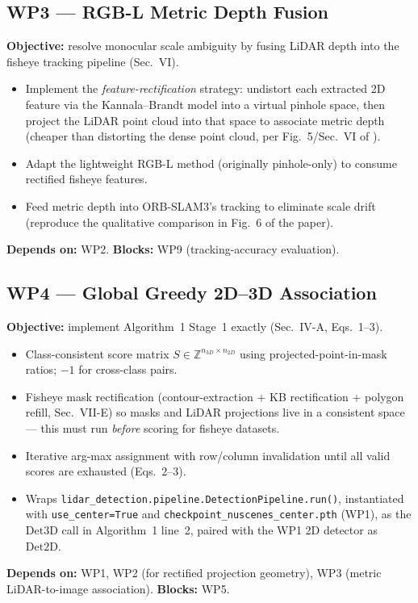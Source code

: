 \documentclass[11pt]{article}
\begin{document}
\subsection*{WP3 --- RGB-L Metric Depth Fusion}
\textbf{Objective:} resolve monocular scale ambiguity by fusing LiDAR depth into the fisheye tracking pipeline (Sec.~VI).
\begin{itemize}[nosep]
  \item Implement the \emph{feature-rectification} strategy: undistort each extracted 2D feature via the Kannala--Brandt model into a virtual pinhole space, then project the LiDAR point cloud into that space to associate metric depth (cheaper than distorting the dense point cloud, per Fig.~5/Sec.~VI of \cite{kourani2026dspslampp}).
  \item Adapt the lightweight RGB-L method \cite{sauerbeck2022rgbl} (originally pinhole-only) to consume rectified fisheye features.
  \item Feed metric depth into ORB-SLAM3's tracking to eliminate scale drift (reproduce the qualitative comparison in Fig.~6 of the paper).
\end{itemize}
\textbf{Depends on:} WP2. \textbf{Blocks:} WP9 (tracking-accuracy evaluation).

\subsection*{WP4 --- Global Greedy 2D--3D Association}
\textbf{Objective:} implement Algorithm~1 Stage~1 exactly (Sec.~IV-A, Eqs.~1--3).
\begin{itemize}[nosep]
  \item Class-consistent score matrix $S \in \mathbb{Z}^{n_{3D}\times n_{2D}}$ using projected-point-in-mask ratios; $-1$ for cross-class pairs.
  \item Fisheye mask rectification (contour-extraction + KB rectification + polygon refill, Sec.~VII-E) so masks and LiDAR projections live in a consistent space --- this must run \emph{before} scoring for fisheye datasets.
  \item Iterative arg-max assignment with row/column invalidation until all valid scores are exhausted (Eqs.~2--3).
  \item Wraps \texttt{lidar\_detection.pipeline.DetectionPipeline.run()}, instantiated with \texttt{use\_center=True} and \texttt{checkpoint\_nuscenes\_center.pth} (WP1), as the $\text{Det3D}$ call in Algorithm~1 line~2, paired with the WP1 2D detector as $\text{Det2D}$.
\end{itemize}
\textbf{Depends on:} WP1, WP2 (for rectified projection geometry), WP3 (metric LiDAR-to-image association). \textbf{Blocks:} WP5.
\end{document}
